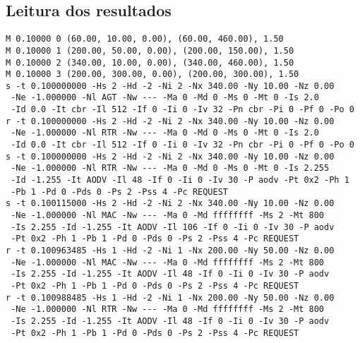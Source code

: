\subsection{Leitura dos resultados}

\begin{verbatim}
M 0.10000 0 (60.00, 10.00, 0.00), (60.00, 460.00), 1.50
M 0.10000 1 (200.00, 50.00, 0.00), (200.00, 150.00), 1.50
M 0.10000 2 (340.00, 10.00, 0.00), (340.00, 460.00), 1.50
M 0.10000 3 (200.00, 300.00, 0.00), (200.00, 300.00), 1.50
s -t 0.100000000 -Hs 2 -Hd -2 -Ni 2 -Nx 340.00 -Ny 10.00 -Nz 0.00 
 -Ne -1.000000 -Nl AGT -Nw --- -Ma 0 -Md 0 -Ms 0 -Mt 0 -Is 2.0 
 -Id 0.0 -It cbr -Il 512 -If 0 -Ii 0 -Iv 32 -Pn cbr -Pi 0 -Pf 0 -Po 0 
r -t 0.100000000 -Hs 2 -Hd -2 -Ni 2 -Nx 340.00 -Ny 10.00 -Nz 0.00 
 -Ne -1.000000 -Nl RTR -Nw --- -Ma 0 -Md 0 -Ms 0 -Mt 0 -Is 2.0 
 -Id 0.0 -It cbr -Il 512 -If 0 -Ii 0 -Iv 32 -Pn cbr -Pi 0 -Pf 0 -Po 0 
s -t 0.100000000 -Hs 2 -Hd -2 -Ni 2 -Nx 340.00 -Ny 10.00 -Nz 0.00 
 -Ne -1.000000 -Nl RTR -Nw --- -Ma 0 -Md 0 -Ms 0 -Mt 0 -Is 2.255 
 -Id -1.255 -It AODV -Il 48 -If 0 -Ii 0 -Iv 30 -P aodv -Pt 0x2 -Ph 1 
 -Pb 1 -Pd 0 -Pds 0 -Ps 2 -Pss 4 -Pc REQUEST 
s -t 0.100115000 -Hs 2 -Hd -2 -Ni 2 -Nx 340.00 -Ny 10.00 -Nz 0.00 
 -Ne -1.000000 -Nl MAC -Nw --- -Ma 0 -Md ffffffff -Ms 2 -Mt 800 
 -Is 2.255 -Id -1.255 -It AODV -Il 106 -If 0 -Ii 0 -Iv 30 -P aodv 
 -Pt 0x2 -Ph 1 -Pb 1 -Pd 0 -Pds 0 -Ps 2 -Pss 4 -Pc REQUEST 
r -t 0.100963485 -Hs 1 -Hd -2 -Ni 1 -Nx 200.00 -Ny 50.00 -Nz 0.00 
 -Ne -1.000000 -Nl MAC -Nw --- -Ma 0 -Md ffffffff -Ms 2 -Mt 800 
 -Is 2.255 -Id -1.255 -It AODV -Il 48 -If 0 -Ii 0 -Iv 30 -P aodv 
 -Pt 0x2 -Ph 1 -Pb 1 -Pd 0 -Pds 0 -Ps 2 -Pss 4 -Pc REQUEST 
r -t 0.100988485 -Hs 1 -Hd -2 -Ni 1 -Nx 200.00 -Ny 50.00 -Nz 0.00 
 -Ne -1.000000 -Nl RTR -Nw --- -Ma 0 -Md ffffffff -Ms 2 -Mt 800 
 -Is 2.255 -Id -1.255 -It AODV -Il 48 -If 0 -Ii 0 -Iv 30 -P aodv 
 -Pt 0x2 -Ph 1 -Pb 1 -Pd 0 -Pds 0 -Ps 2 -Pss 4 -Pc REQUEST
\end{verbatim}

